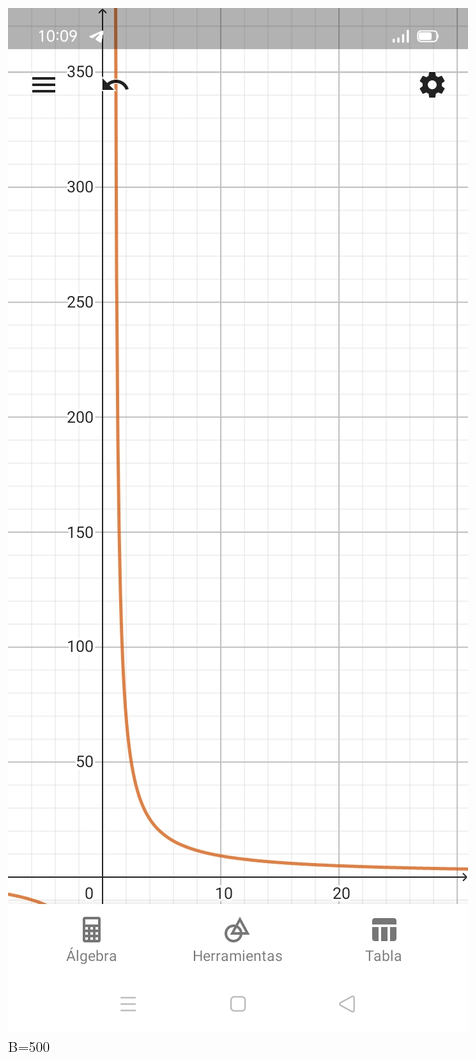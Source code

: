 \documentclass{article}
\begin{document}
\begin{center}
  \includegraphics[scale=0.2]{Imagenes/b_75.jpg}\\
  B=500\\

\end{center}
\end{document}
